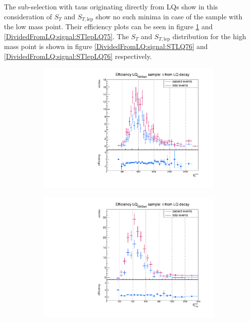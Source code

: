 %
The sub-selection with taus originating directly from LQs show in this consideration of $S_T$ and $S_{T,\text{lep}}$ show no such minima in case of the sample with the low mass point. Their efficiency plots can be seen in figure \ref{DividedFromLQ:signal:STLQ75} and \ref{DividedFromLQ:signal:STlepLQ75}. The $S_T$ and $S_{T,\text{lep}}$ distribution for the high mass point is shown in figure \ref{DividedFromLQ:signal:STLQ76} and \ref{DividedFromLQ:signal:STlepLQ76} respectively. \newline 
%
\begin{figure}
  \centering
                \begin{subfigure}[t]{0.49\textwidth}
                \includegraphics[width=\textwidth]{figures/plots/LQ75/Divided_fromLQST.pdf}
                \label{DividedFromLQ:signal:STLQ75}
                \end{subfigure}
                \begin{subfigure}[t]{0.49\textwidth}
                \includegraphics[width=\textwidth]{figures/plots/LQ75/Divided_fromLQSTlep.pdf}

\end{subfigure}
\end{figure}
